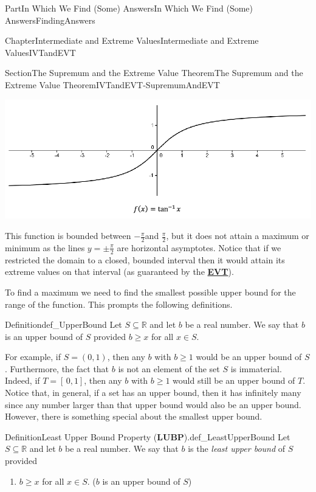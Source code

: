 \documentclass[oneside,10pt,]{book}
\newcommand{\terminology}[1]{\textbf{#1}}
\numberwithin{equation}{part}
\begin{document}
\begin{partptx}{Part}{In Which We Find (Some) Answers}{}{In Which We Find (Some) Answers}{}{}{FindingAnswers}
\begin{chapterptx}{Chapter}{Intermediate and Extreme Values}{}{Intermediate and Extreme Values}{}{}{IVTandEVT}
\begin{sectionptx}{Section}{The Supremum and the Extreme Value Theorem}{}{The Supremum and the Extreme Value Theorem}{}{}{IVTandEVT-SupremumAndEVT}
\begin{image}{0.125}{0.75}{0.125}{}%
\includegraphics[width=\linewidth]{external/images/Ch6fig8.png}
\end{image}%
This function is bounded between \(-\frac{\pi}{2}\)and \(\frac{\pi}{2}\), but it does not attain a maximum or minimum as the lines \(y=\pm\frac{\pi}{2}\) are horizontal asymptotes. Notice that if we restricted the domain to a closed, bounded interval then it would attain its extreme values on that interval (as guaranteed by the \hyperref[thm_EVT]{\terminology{EVT}}).%
\par
To find a maximum we need to find the smallest possible upper bound for the range of the function. This prompts the following definitions.%
\begin{definition}{Definition}{}{def_UpperBound}%
 Let \(S\subseteq\mathbb{R}\) and let \(b\) be a real number. We say that \(b\) is an upper bound of \(S\) provided \(b\geq x\) for all \(x\in S\).%
\end{definition}
For example, if \(S=(0,1)\), then any \(b\) with \(b\geq 1\) would be an upper bound of \(S\). Furthermore, the fact that \(b\) is not an element of the set \(S\) is immaterial. Indeed, if \(T=[\,0,1]\), then any \(b\) with \(b\geq 1\) would still be an upper bound of \(T\). Notice that, in general, if a set has an upper bound, then it has infinitely many since any number larger than that upper bound would also be an upper bound. However, there is something special about the smallest upper bound.%
\begin{definition}{Definition}{Least Upper Bound Property (\terminology{LUBP}).}{def_LeastUpperBound}%
%
Let \(S\subseteq\mathbb{R}\) and let \(b\) be a real number.  We say that \(b\) is the \emph{least upper bound} of \(S\) provided%
\par
%
\begin{enumerate}[label={(\alph*)}]
\item{}\(b\geq x\) for all \(x\in S\). (\(b\) is an upper bound of \(S\))%

\end{enumerate}
\end{definition}
\end{sectionptx}
\end{chapterptx}
\end{partptx}
\end{document}
